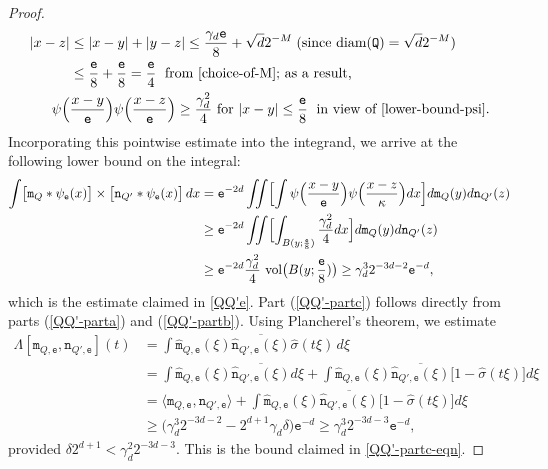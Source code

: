 \documentclass[a4paper,11pt]{amsart}
\numberwithin{equation}{section}
\begin{document}
\begin{proof}
\begin{align*}
|x-z| &\leq  |x-y| + |y-z| \leq \frac{\gamma_d \mathtt e}{8} + \sqrt{d} 2^{-M} \; (\text{since } \text{diam}(\mathtt Q) = \sqrt{d} 2^{-M}) \\
&\leq \frac{\mathtt e}{8} + \frac{\mathtt e}{8} =  \frac{\mathtt e}{4} \;  \text{ from \eqref{choice-of-M}; as a result,} \\
\psi \Bigl(&\frac{x-y}{\mathtt e} \Bigr) \psi \Bigl(\frac{x-z}{\mathtt e} \Bigr) \geq \frac{\gamma_d^2}{4}\text{ for } |x - y| \leq \frac{\mathtt e}{8} \; \text{ in view of \eqref{lower-bound-psi}}. 
\end{align*}
Incorporating this pointwise estimate into the integrand,  we arrive at the following lower bound on the integral:
\begin{align*} 
\int \bigl[\mathtt m_{Q} \ast \psi_{\mathtt e}(x) \bigr] \times \bigl[ \mathtt n_{Q'} \ast \psi_{\mathtt e}(x) \bigr] \, dx &= \mathtt e^{-2d} \iint \Bigl[ \int \psi \Bigl(\frac{x-y}{\mathtt e} \Bigr) \psi \Bigl(\frac{x-z}{\kappa} \Bigr) dx \Bigr] d\mathtt m_Q(y) d\mathtt n_{Q'}(z)  \\   
&\geq \mathtt e^{-2d} \iint  \Bigl[ \int_{B(y; \frac{\mathtt e}{8})} \frac{\gamma_d^2}{4} dx \Bigr] d\mathtt m_Q(y) d\mathtt n_{Q'}(z) \\
&\geq \mathtt e^{-2d} \frac{\gamma_d^2}{4}  \text{ vol}\bigl(B(y; \frac{\mathtt e}{8})\bigr)\geq \gamma_d^3 2^{-3d-2}\mathtt e^{-d}, 
\end{align*}  
which is the estimate claimed in \eqref{QQ'e}. 
\vskip0.1in
\noindent Part (\ref{QQ'-partc}) follows directly from parts (\ref{QQ'-parta}) and (\ref{QQ'-partb}). Using Plancherel's theorem, we estimate
\begin{align*}
\Lambda[\mathtt m_{Q, \mathtt e}, \mathtt n_{Q', \mathtt e}](t) &=  \int \widehat{\mathtt m}_{Q, \mathtt e}(\xi) \overline{\widehat{\mathtt n}_{Q', \mathtt e}(\xi)} \widehat{\sigma}(t \xi) \, d\xi \\
&=  \int \widehat{\mathtt m}_{Q, \mathtt e}(\xi) \overline{\widehat{\mathtt n}_{Q', \mathtt e}(\xi)} d\xi + \int \widehat{\mathtt m}_{Q, \mathtt e}(\xi) \overline{\widehat{\mathtt n}_{Q', \mathtt e}(\xi)} \bigl[1 - \widehat{\sigma}(t\xi) \bigr] d\xi \\ 
&= \langle \mathtt m_{Q,\mathtt e}, \mathtt n_{Q', \mathtt e} \rangle  + \int \widehat{\mathtt m}_{Q, \mathtt e}(\xi) \overline{\widehat{\mathtt n}_{Q', \mathtt e}(\xi)} \bigl[1 - \widehat{\sigma}(t\xi) \bigr] d\xi \\ 
&\geq\bigl(  \gamma_d^{3}  2^{-3d-2} - 2^{d+1} \gamma_d \delta \bigr) \mathtt e^{-d} \geq \gamma_d^{3} 2^{-3d-3} \mathtt e^{-d},
\end{align*}
provided $\delta 2^{d+1} < \gamma_d^{2} 2^{-3d-3}$. This is the bound claimed in \eqref{QQ'-partc-eqn}. 
\end{proof}
 
\end{document}
